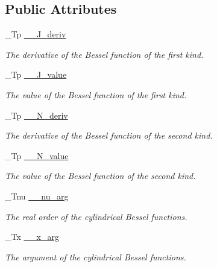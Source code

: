 \subsection*{Public Attributes}
\begin{DoxyCompactItemize}
\item 
\+\_\+\+Tp \hyperlink{struct____gnu__cxx_1_1____cyl__bessel__t_aa87001a6f705e130961ade4ff32b8557}{\+\_\+\+\_\+\+J\+\_\+deriv}
\begin{DoxyCompactList}\small\item\em The derivative of the Bessel function of the first kind. \end{DoxyCompactList}\item 
\+\_\+\+Tp \hyperlink{struct____gnu__cxx_1_1____cyl__bessel__t_ad304cc5e26133341ec42940f54f551f9}{\+\_\+\+\_\+\+J\+\_\+value}
\begin{DoxyCompactList}\small\item\em The value of the Bessel function of the first kind. \end{DoxyCompactList}\item 
\+\_\+\+Tp \hyperlink{struct____gnu__cxx_1_1____cyl__bessel__t_a4bed189cfce4ef5f47cae245a7278f83}{\+\_\+\+\_\+\+N\+\_\+deriv}
\begin{DoxyCompactList}\small\item\em The derivative of the Bessel function of the second kind. \end{DoxyCompactList}\item 
\+\_\+\+Tp \hyperlink{struct____gnu__cxx_1_1____cyl__bessel__t_ac85df4718f58f14fd64631bbd41e8817}{\+\_\+\+\_\+\+N\+\_\+value}
\begin{DoxyCompactList}\small\item\em The value of the Bessel function of the second kind. \end{DoxyCompactList}\item 
\+\_\+\+Tnu \hyperlink{struct____gnu__cxx_1_1____cyl__bessel__t_a3d17d7f7196d7aef725228cf02269195}{\+\_\+\+\_\+nu\+\_\+arg}
\begin{DoxyCompactList}\small\item\em The real order of the cylindrical Bessel functions. \end{DoxyCompactList}\item 
\+\_\+\+Tx \hyperlink{struct____gnu__cxx_1_1____cyl__bessel__t_aac526f7bf86ebf0201e46545d9927f15}{\+\_\+\+\_\+x\+\_\+arg}
\begin{DoxyCompactList}\small\item\em The argument of the cylindrical Bessel functions. \end{DoxyCompactList}\end{DoxyCompactItemize}


